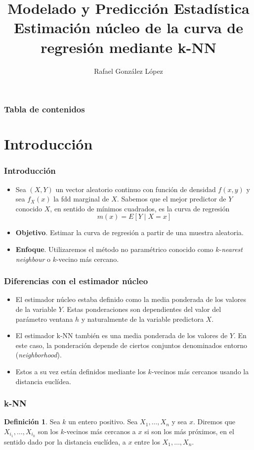 \documentclass{beamer}
\title{Modelado y Predicción Estadística\\
Estimación núcleo de la curva de \\regresión mediante k-NN}
\author{Rafael González López 
}
\institute{
Universidad de Sevilla}
\date{}
\theoremstyle{definition}
\newtheorem{defi}{Definición}
\begin{document}
\frame{\titlepage}

\begin{frame}
\frametitle{Tabla de contenidos}
\tableofcontents
\end{frame}

\section{Introducción}

\begin{frame}
\frametitle{Introducción}
\begin{itemize}
\item Sea $(X,Y)$ un vector aleatorio continuo con función de densidad $f(x,y)$ y sea $f_X(x)$ la fdd marginal de $X$. Sabemos que el mejor predictor de $Y$ conocido $X$, en sentido de mínimos cuadrados, es la curva de regresión
$$
m(x)=E[Y\mid X=x]
$$
\item \textbf{Objetivo}. Estimar la curva de regresión a partir de una muestra aleatoria.
\item \textbf{Enfoque}. Utilizaremos el método no paramétrico conocido como $k$-\textit{nearest neighbour} o $k$-vecino más cercano.
\end{itemize}

\end{frame}

\begin{frame}
\frametitle{Diferencias con el estimador núcleo}
\begin{itemize}
\item El estimador núcleo estaba definido como la media ponderada de los valores de la variable $Y$. Estas ponderaciones son dependientes del valor del parámetro ventana $h$ y naturalmente de la variable predictora $X$.
\item El estimador k-NN también es una media ponderada de los valores de $Y$. En este caso, la ponderación depende de ciertos conjuntos denominados entorno (\textit{neighborhood}). 
\item Estos a su vez están definidos mediante los $k$-vecinos más cercanos usando la distancia euclídea.
\end{itemize}
\end{frame}
\begin{frame}
\frametitle{k-NN}
\begin{defi}
Sea $k$ un entero positivo. Sea $X_1,\dotsc,X_n$ y sea $x$. Diremos que $X_{i_1},\dotsc,X_{i_k}$ son los $k$-vecinos más cercanos a $x$ si son los más próximos, en el sentido dado por la distancia euclídea, a $x$ entre los $X_1,\dotsc,X_n$.
\end{defi}
\end{frame}
\end{document}
